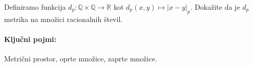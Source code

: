 \documentclass[11pt,a4paper]{exam}
\renewcommand{\leq}{\leqslant} %
\renewcommand{\{}{\lbrace}
\renewcommand{\}}{\rbrace}
\begin{document}
\begin{questions}
		Definiramo funkcija $d_{p}: \mathbb{Q} \times \mathbb{Q}\to \mathbb{R}$ kot $d_{p}(x,y) \mapsto |x - y|_p$. 
		Dokažite da je $d_{p}$ metrika na množici racionalnih števil. 


	\end{questions}
\pagestyle{empty}
\clearpage




\pagestyle{head}
\paragraph{Ključni pojmi:}	Metrični prostor, oprte množice, zaprte množice.
\end{document}
